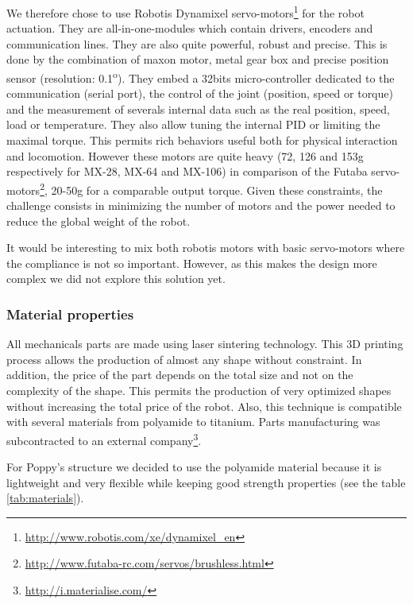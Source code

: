 We therefore chose to use Robotis Dynamixel servo-motors\footnote{\url{http://www.robotis.com/xe/dynamixel_en}} for the robot actuation.
They are all-in-one-modules which contain drivers, encoders and communication lines.
They are also quite powerful, robust and precise.
This is done by the combination of maxon motor, metal gear box and precise position sensor (resolution: 0.1\textsuperscript{o}).
They embed a 32bits micro-controller dedicated to the communication (serial port), the control of the joint (position, speed or torque) and the measurement of severals internal data such as the real position, speed, load or temperature.
They also allow tuning the internal PID or limiting the maximal torque.
This permits rich behaviors useful both for physical interaction and locomotion.
However these motors are quite heavy (72, 126 and 153g respectively for MX-28, MX-64 and MX-106) in comparison of the Futaba servo-motors\footnote{\url{http://www.futaba-rc.com/servos/brushless.html}}, 20-50g for a comparable output torque.
Given these constraints, the challenge consists in minimizing the number of motors and the power needed to reduce the global weight of the robot.

It would be interesting to mix both robotis motors with basic servo-motors where the compliance is not so important.
However, as this makes the design more complex we did not explore this solution yet.


\subsubsection{Material properties} %
\label{ssub:material_properties}

All mechanicals parts are made using laser sintering technology.
This 3D printing process allows the production of almost any shape without constraint.
In addition, the price of the part depends on the total size and not on the complexity of the shape.
This permits the production of very optimized shapes without increasing the total price of the robot.
Also, this technique is compatible with several materials from polyamide to titanium.
Parts manufacturing was subcontracted to an external company\footnote{\url{http://i.materialise.com/}}.

For Poppy's structure we decided to use the polyamide material because it is lightweight and very flexible while keeping good strength properties (see the table \ref{tab:materials}).

